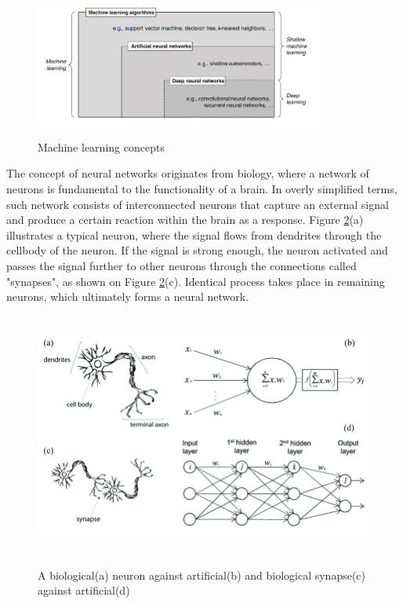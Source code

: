 \documentclass[english, 12pt, a4paper, elec, utf8, a-1b, online]{aaltothesis}
\begin{document}
\begin{figure}[htb]
	\begin{center}
		\includegraphics[height=4cm]{./ml1.jpg}
	\end{center}
	\caption{Machine learning concepts \cite{Janiesch2021}}
	\begin{center}
		\label{MLConcepts}
	\end{center}
\end{figure}
\FloatBarrier

The concept of neural networks originates from biology, where a network of neurons is fundamental to the functionality of a brain. In overly simplified terms, such network consists of interconnected neurons that capture an external signal and produce a certain reaction within the brain as a response. Figure \ref{NeuronSchem}(a) illustrates a typical neuron, where the signal flows from dendrites through the cellbody of the neuron. If the signal is strong enough, the neuron activated and passes the signal further to other neurons through the connections called "synapses", as shown on Figure \ref{NeuronSchem}(c). Identical process takes place in remaining neurons, which ultimately forms a neural network.\cite{Mehlig_2021}

\begin{figure}[htb]
	\begin{center}
		\includegraphics[height=8cm]{./BioNeuronVsArtificial.png}
	\end{center}
	\caption{A biological(a) neuron against artificial(b) and biological synapse(c) against artificial(d)\cite{article1}}
	\begin{center}
		\label{NeuronSchem}
	\end{center}
\end{figure}
\FloatBarrier
\end{document}

